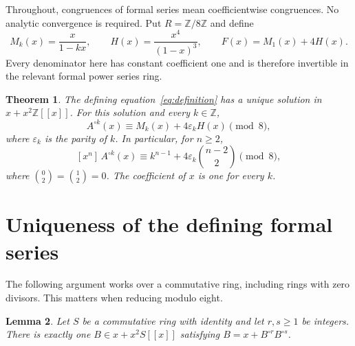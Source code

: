 \documentclass[11pt]{article}
\newtheorem{theorem}{Theorem}
\newtheorem{lemma}[theorem]{Lemma}
\theoremstyle{remark}
\newcommand{\Z}{\mathbb Z}
\newcommand{\eps}{\varepsilon}
\newcommand{\itn}[2]{{#1}^{\circ #2}}
\newcommand{\coeff}[2]{[x^{#1}]\,#2}
\begin{document}
Throughout, congruences of formal series mean coefficientwise congruences.
No analytic convergence is required. Put $R=\Z/8\Z$ and define
\begin{equation}\label{eq:model}
M_k(x)=\frac{x}{1-kx},\qquad
H(x)=\frac{x^4}{(1-x)^3},\qquad
F(x)=M_1(x)+4H(x).
\end{equation}
Every denominator here has constant coefficient one and is therefore
invertible in the relevant formal power series ring.

\begin{theorem}\label{thm:main}
The defining equation~\eqref{eq:definition} has a unique solution in
$x+x^2\Z[[x]]$. For this solution and every $k\in\Z$,
\begin{equation}\label{eq:main}
\itn{A}{k}(x)\equiv M_k(x)+4\eps_kH(x)\pmod 8,
\end{equation}
where $\eps_k$ is the parity of $k$. In particular, for $n\geq2$,
\begin{equation}\label{eq:coefficients}
\coeff{n}{\itn{A}{k}(x)}
\equiv k^{n-1}+4\eps_k\binom{n-2}{2}\pmod 8,
\end{equation}
where $\binom{0}{2}=\binom{1}{2}=0$. The coefficient of $x$ is one
for every $k$.
\end{theorem}

\section{Uniqueness of the defining formal series}

The following argument works over a commutative ring, including rings
with zero divisors. This matters when reducing modulo eight.

\begin{lemma}\label{lem:fixedpoint}
Let $S$ be a commutative ring with identity and let $r,s\geq1$ be
integers. There is exactly one $B\in x+x^2S[[x]]$ satisfying
$B=x+\itn{B}{r}\itn{B}{s}$.
\end{lemma}
\end{document}
